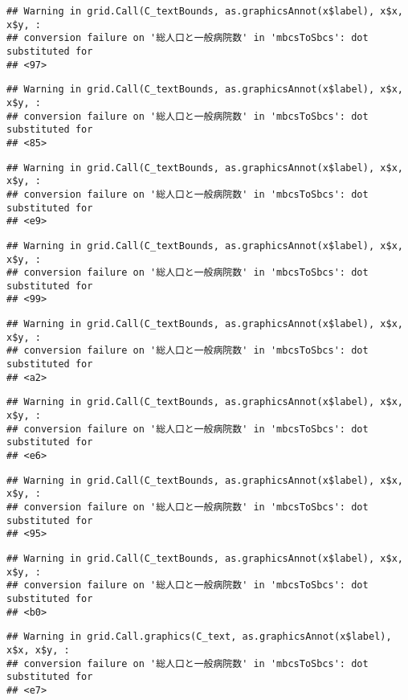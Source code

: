 \documentclass[
]{article}
\begin{document}
\begin{verbatim}
## Warning in grid.Call(C_textBounds, as.graphicsAnnot(x$label), x$x, x$y, :
## conversion failure on '総人口と一般病院数' in 'mbcsToSbcs': dot substituted for
## <97>
\end{verbatim}

\begin{verbatim}
## Warning in grid.Call(C_textBounds, as.graphicsAnnot(x$label), x$x, x$y, :
## conversion failure on '総人口と一般病院数' in 'mbcsToSbcs': dot substituted for
## <85>
\end{verbatim}

\begin{verbatim}
## Warning in grid.Call(C_textBounds, as.graphicsAnnot(x$label), x$x, x$y, :
## conversion failure on '総人口と一般病院数' in 'mbcsToSbcs': dot substituted for
## <e9>
\end{verbatim}

\begin{verbatim}
## Warning in grid.Call(C_textBounds, as.graphicsAnnot(x$label), x$x, x$y, :
## conversion failure on '総人口と一般病院数' in 'mbcsToSbcs': dot substituted for
## <99>
\end{verbatim}

\begin{verbatim}
## Warning in grid.Call(C_textBounds, as.graphicsAnnot(x$label), x$x, x$y, :
## conversion failure on '総人口と一般病院数' in 'mbcsToSbcs': dot substituted for
## <a2>
\end{verbatim}

\begin{verbatim}
## Warning in grid.Call(C_textBounds, as.graphicsAnnot(x$label), x$x, x$y, :
## conversion failure on '総人口と一般病院数' in 'mbcsToSbcs': dot substituted for
## <e6>
\end{verbatim}

\begin{verbatim}
## Warning in grid.Call(C_textBounds, as.graphicsAnnot(x$label), x$x, x$y, :
## conversion failure on '総人口と一般病院数' in 'mbcsToSbcs': dot substituted for
## <95>
\end{verbatim}

\begin{verbatim}
## Warning in grid.Call(C_textBounds, as.graphicsAnnot(x$label), x$x, x$y, :
## conversion failure on '総人口と一般病院数' in 'mbcsToSbcs': dot substituted for
## <b0>
\end{verbatim}

\begin{verbatim}
## Warning in grid.Call.graphics(C_text, as.graphicsAnnot(x$label), x$x, x$y, :
## conversion failure on '総人口と一般病院数' in 'mbcsToSbcs': dot substituted for
## <e7>
\end{verbatim}
\end{document}
